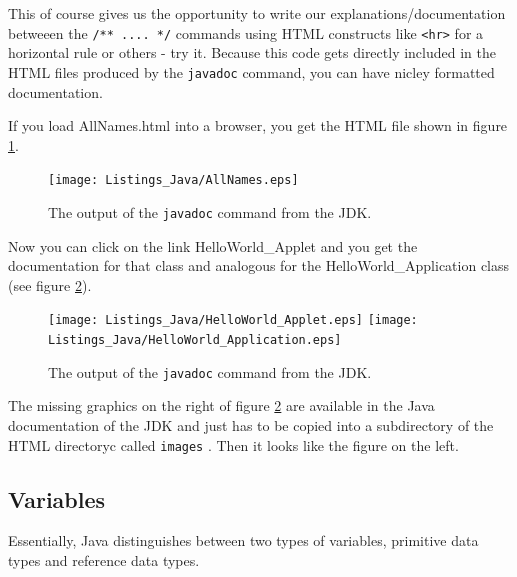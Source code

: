 This of course gives us the opportunity to write our 
explanations/documentation
betweeen the \verb|/** .... */| commands using HTML constructs like
\verb|<hr>| for a horizontal rule or others - try it. 
Because this code gets directly included in the HTML files produced by
the \verb|javadoc| command, you can have nicley formatted documentation.

If you load AllNames.html into a browser, you get the HTML file shown
in figure \ref{fig:javadoc1}.
\begin{figure}[htbp]
  \begin{center}
    \leavevmode
 \texttt{[image: Listings\_Java/AllNames.eps]} 
    \caption{The output of the \texttt{javadoc} command from the JDK.}
    \label{fig:javadoc1}
  \end{center}
\end{figure}
Now you can click on the link HelloWorld\_Applet and you get the
documentation for that class and analogous for the HelloWorld\_Application
class (see figure \ref{fig:javadoc2}).
\begin{figure}[htbp]
  \begin{center}
    \leavevmode
  \texttt{[image: Listings\_Java/HelloWorld\_Applet.eps]}
  \texttt{[image: Listings\_Java/HelloWorld\_Application.eps]}
    \caption{The output of the \texttt{javadoc} command from the JDK.}
    \label{fig:javadoc2}
  \end{center}
\end{figure}
The missing graphics on the right of figure \ref{fig:javadoc2} 
are available in the Java documentation of the
JDK and just has to be copied into a subdirectory  
of the HTML directoryc called \verb|images| . 
Then it looks like the figure on the left.

\subsection{Variables}
\label{sec:Variables}

Essentially, Java distinguishes between two types of variables,
primitive data types and reference data types.
